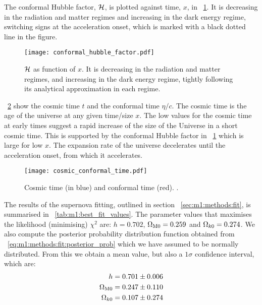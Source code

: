     The conformal Hubble factor, $\mathcal{H}$, is plotted against time, $x$, in ~\cref{fig:m1:conformal_hubble_factor_Hp}. It is decreasing in the radiation and matter regimes and increasing in the dark energy regime, switching signs at the acceleration onset, which is marked with a black dotted line in the figure. 
    \begin{figure}
        \texttt{[image: conformal\_hubble\_factor.pdf]}
        \caption{$\mathcal{H}$ as function of $x$. It is decreasing in the radiation and matter regimes, and increasing in the dark energy regime, tightly following its analytical approximation in each regime.}
        \label{fig:m1:conformal_hubble_factor_Hp}
    \end{figure}

    ~\cref{fig:m1:cosmic_conformal_time} show the cosmic time $t$ and the conformal time $\eta/c$. The cosmic time is the age of the universe at any given time/size $x$. The low values for the cosmic time at early times suggest a rapid increase of the size of the Universe in a short cosmic time. This is supported by the conformal Hubble factor in ~\cref{fig:m1:conformal_hubble_factor_Hp} which is large for low $x$. The expansion rate of the universe decelerates until the acceleration onset, from which it accelerates. 

    \begin{figure}
        \texttt{[image: cosmic\_conformal\_time.pdf]}
        \caption{Cosmic time (in blue) and conformal time (red). .}
        \label{fig:m1:cosmic_conformal_time}
    \end{figure}

    The results of the supernova fitting, outlined in section ~\cref{sec:m1:methods:fit}, is summarised in ~\cref{tab:m1:best_fit_values}. The parameter values that maximises the likelihood (minimising) $\chi^2$ are: $h=0.702$, $\Omega_\mathrm{M0} = 0.259$ and $\Omega_{k0} = 0.274$. We also compute the posterior probability distribution function obtained from ~\cref{eq:m1:methods:fit:posterior_prob} which we have assumed to be normally distributed. From this we obtain a mean value, but also a $1\sigma$ confidence interval, which are:
    \begin{equation}\label{eq:m1:results:posterior_results}
        \begin{split}
            h &= 0.701\pm0.006 \\
            \Omega_\mathrm{M0} &= 0.247\pm0.110 \\
            \Omega_{k0} &= 0.107 \pm 0.274
        \end{split}
    \end{equation}
    

